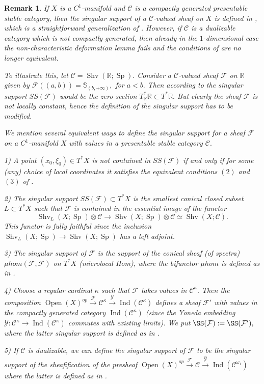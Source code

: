 \documentclass[11pt,leqno]{amsart}
\newtheorem{remark}[theo]{Remark}
\numberwithin{equation}{section}
\def\R{\mathbb{R}}
\def\bS{\mathbb{S}}
\newcommand{\xto}{\xrightarrow}
\newcommand{\cF}{{\mathcal F}}
\newcommand{\cC}{{\mathcal C}}
\newcommand{\cY}{{\mathcal Y}}
\newcommand{\Sh}{\operatorname{Shv}}
\newcommand{\Sp}{\operatorname{Sp}}
\newcommand{\Ind}{\operatorname{Ind}}
\newcommand{\Open}{\operatorname{Open}}
\begin{document}
\begin{remark}\label{rem:SS_general} If $X$ is a $C^1$-manifold and $\cC$ is a compactly generated presentable stable category, then the singular support of a $\cC$-valued sheaf on $X$ is defined in \cite[Definition 4.5]{RS}, which is a straightforward generalization of \cite[Definition 4.4.1]{KS}. However, if $\cC$ is a dualizable category which is not compactly generated, then already in the $1$-dimensional case the non-characteristic deformation lemma \cite[Theorem 4.1]{RS} fails and the conditions of \cite[Proposition 5.1.1]{KS} are no longer equivalent. 

To illustrate this, let $\cC=\Sh(\R;\Sp).$ 
Consider a $\cC$-valued sheaf $\cF$ on $\R$ given by $\cF((a,b))=\bS_{(b,+\infty)},$ for $a<b.$ Then according to \cite[Definition 4.5]{RS} the singular support $SS(\cF)$ would be the zero section $T^*_{\R}\R\subset T^*\R.$ But clearly the sheaf $\cF$ is not locally constant, hence the definition of the singular support has to be modified. 

We mention several equivalent ways to define the singular support for a sheaf $\cF$ on a $C^1$-manifold $X$ with values in a presentable stable category $\cC.$

1) A point $(x_0,\xi_0)\in T^*X$ is not contained in $SS(\cF)$ if and only if for some (any) choice of local coordinates it satisfies the equivalent conditions $(2)$ and $(3)$ of \cite[Proposition 5.1.1]{KS}.

2) The singular support $SS(\cF)\subset T^*X$ is the smallest conical closed subset $L\subset T^*X$ such that $\cF$ is contained in the essential image of the functor $$\Sh_L(X;\Sp)\otimes\cC\to \Sh(X;\Sp)\otimes\cC\simeq\Sh(X;\cC).$$ This functor is fully faithful since the inclusion $\Sh_L(X;\Sp)\to \Sh(X;\Sp)$ has a left adjoint.

3) The singular support of $\cF$ is the support of the conical sheaf (of spectra) $\mu hom(\cF,\cF)$ on $T^*X$ (microlocal Hom), where the bifunctor $\mu hom$ is defined as in \cite[Definition 4.4.1]{KS}.

4) Choose a regular cardinal $\kappa$ such that $\cF$ takes values in $\cC^{\kappa}.$ Then the composition $\Open(X)^{op}\xto{\cF}\cC^{\kappa}\xto{\cY}\Ind(\cC^{\kappa})$ defines a sheaf $\cF'$ with values in the compactly generated category $\Ind(\cC^{\kappa})$ (since the Yoneda embedding $\cY:\cC^{\kappa}\to\Ind(\cC^{\kappa})$ commutes with existing limits). We put $\SS(\cF):=\SS(\cF'),$ where the latter singular support is defined as in \cite[Definition 4.5]{RS}.

5) If $\cC$ is dualizable, we can define the singular support of $\cF$ to be the singular support of the sheafification of the presheaf $\Open(X)^{op}\xto{\cF}\cC\xto{\hat{\cY}}\Ind(\cC^{\omega_1})$ where the latter is defined as in \cite[Definition 4.5]{RS}.
\end{remark}
\end{document}
